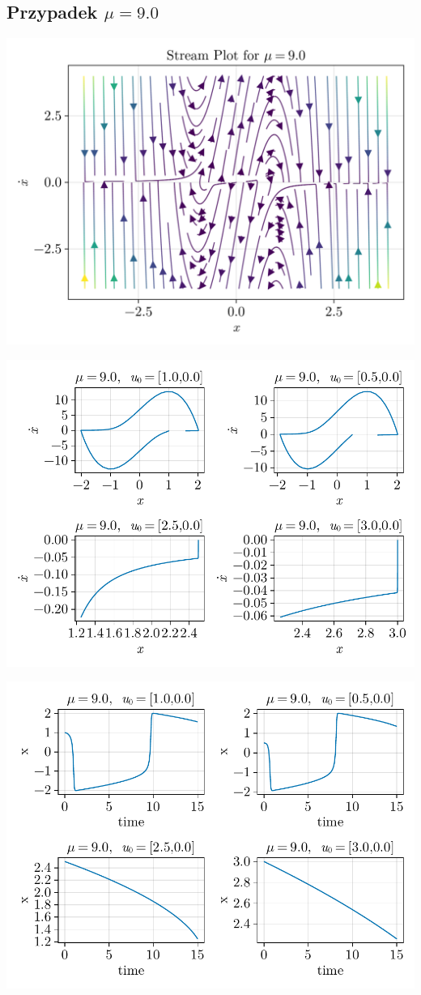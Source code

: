 \clearpage

%
%
\subsection{Przypadek $\mu = 9.0$}
\includegraphics[width=\textwidth]{out/stream_13.png}

\includegraphics[width=\textwidth]{out/phase_13.pdf}

\includegraphics[width=\textwidth]{out/xfromt_13.pdf}

\clearpage
